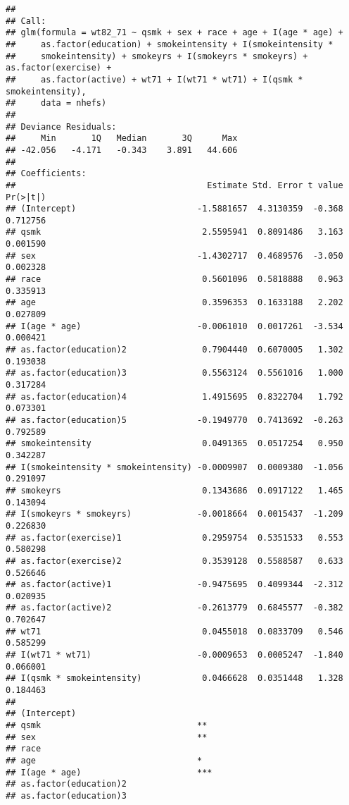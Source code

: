 \documentclass[10pt,]{book}
\begin{document}
\begin{verbatim}
## 
## Call:
## glm(formula = wt82_71 ~ qsmk + sex + race + age + I(age * age) + 
##     as.factor(education) + smokeintensity + I(smokeintensity * 
##     smokeintensity) + smokeyrs + I(smokeyrs * smokeyrs) + as.factor(exercise) + 
##     as.factor(active) + wt71 + I(wt71 * wt71) + I(qsmk * smokeintensity), 
##     data = nhefs)
## 
## Deviance Residuals: 
##     Min       1Q   Median       3Q      Max  
## -42.056   -4.171   -0.343    3.891   44.606  
## 
## Coefficients:
##                                      Estimate Std. Error t value Pr(>|t|)
## (Intercept)                        -1.5881657  4.3130359  -0.368 0.712756
## qsmk                                2.5595941  0.8091486   3.163 0.001590
## sex                                -1.4302717  0.4689576  -3.050 0.002328
## race                                0.5601096  0.5818888   0.963 0.335913
## age                                 0.3596353  0.1633188   2.202 0.027809
## I(age * age)                       -0.0061010  0.0017261  -3.534 0.000421
## as.factor(education)2               0.7904440  0.6070005   1.302 0.193038
## as.factor(education)3               0.5563124  0.5561016   1.000 0.317284
## as.factor(education)4               1.4915695  0.8322704   1.792 0.073301
## as.factor(education)5              -0.1949770  0.7413692  -0.263 0.792589
## smokeintensity                      0.0491365  0.0517254   0.950 0.342287
## I(smokeintensity * smokeintensity) -0.0009907  0.0009380  -1.056 0.291097
## smokeyrs                            0.1343686  0.0917122   1.465 0.143094
## I(smokeyrs * smokeyrs)             -0.0018664  0.0015437  -1.209 0.226830
## as.factor(exercise)1                0.2959754  0.5351533   0.553 0.580298
## as.factor(exercise)2                0.3539128  0.5588587   0.633 0.526646
## as.factor(active)1                 -0.9475695  0.4099344  -2.312 0.020935
## as.factor(active)2                 -0.2613779  0.6845577  -0.382 0.702647
## wt71                                0.0455018  0.0833709   0.546 0.585299
## I(wt71 * wt71)                     -0.0009653  0.0005247  -1.840 0.066001
## I(qsmk * smokeintensity)            0.0466628  0.0351448   1.328 0.184463
##                                       
## (Intercept)                           
## qsmk                               ** 
## sex                                ** 
## race                                  
## age                                *  
## I(age * age)                       ***
## as.factor(education)2                 
## as.factor(education)3                 

\end{verbatim}
\end{document}
